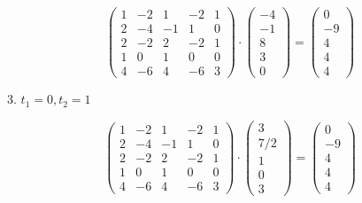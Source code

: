 \documentclass[12pt, a4paper]{article}
\begin{document}
    \begin{equation}
        \left(\begin{matrix}
            1 & -2 & 1 & -2 & 1 \\
            2 & -4 & -1 & 1 & 0 \\
            2 & -2 & 2 & -2 & 1 \\
            1 & 0 & 1 & 0 & 0 \\
            4 & -6 & 4 & -6 & 3
        \end{matrix}\right) \cdot \left(\begin{matrix}
            -4 \\
            -1 \\
            8 \\
            3 \\
            0
        \end{matrix}\right) =\left(\begin{matrix}
            0 \\
            -9 \\
            4 \\
            4 \\
            4
        \end{matrix}\right)
    \end{equation}

    3. $t_1 = 0, t_2 = 1$

    \begin{equation}
        \left(\begin{matrix}
            1 & -2 & 1 & -2 & 1 \\
            2 & -4 & -1 & 1 & 0 \\
            2 & -2 & 2 & -2 & 1 \\
            1 & 0 & 1 & 0 & 0 \\
            4 & -6 & 4 & -6 & 3
        \end{matrix}\right) \cdot \left(\begin{matrix}
            3 \\
            7/2 \\
            1 \\
            0 \\
            3
        \end{matrix}\right) =\left(\begin{matrix}
            0 \\
            -9 \\
            4 \\
            4 \\
            4
        \end{matrix}\right)
    \end{equation}
\end{document}
